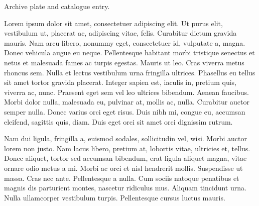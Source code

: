\documentclass{article}
\begin{document}
\begin{center}
Archive plate and catalogue entry.
\end{center}
Lorem ipsum dolor sit amet, consectetuer adipiscing elit. Ut purus elit,
vestibulum ut, placerat ac, adipiscing vitae, felis. Curabitur dictum
gravida mauris. Nam arcu libero, nonummy eget, consectetuer id,
vulputate a, magna. Donec vehicula augue eu neque. Pellentesque habitant
morbi tristique senectus et netus et malesuada fames ac turpis egestas.
Mauris ut leo. Cras viverra metus rhoncus sem. Nulla et lectus
vestibulum urna fringilla ultrices. Phasellus eu tellus sit amet tortor
gravida placerat. Integer sapien est, iaculis in, pretium quis, viverra
ac, nunc. Praesent eget sem vel leo ultrices bibendum. Aenean faucibus.
Morbi dolor nulla, malesuada eu, pulvinar at, mollis ac, nulla.
Curabitur auctor semper nulla. Donec varius orci eget risus. Duis nibh
mi, congue eu, accumsan eleifend, sagittis quis, diam. Duis eget orci
sit amet orci dignissim rutrum.

Nam dui ligula, fringilla a, euismod sodales, sollicitudin vel, wisi.
Morbi auctor lorem non justo. Nam lacus libero, pretium at, lobortis
vitae, ultricies et, tellus. Donec aliquet, tortor sed accumsan
bibendum, erat ligula aliquet magna, vitae ornare odio metus a mi. Morbi
ac orci et nisl hendrerit mollis. Suspendisse ut massa. Cras nec ante.
Pellentesque a nulla. Cum sociis natoque penatibus et magnis dis
parturient montes, nascetur ridiculus mus. Aliquam tincidunt urna. Nulla
ullamcorper vestibulum turpis. Pellentesque cursus luctus mauris.
\end{document}
